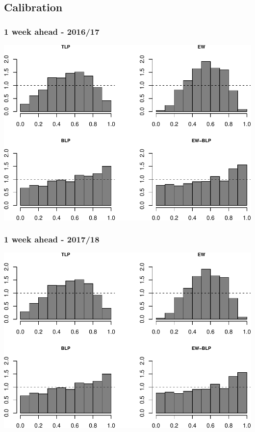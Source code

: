 \documentclass[]{article}
\begin{document}
\hypertarget{calibration}{%
\subsection{Calibration}\label{calibration}}

\hypertarget{week-ahead---201617}{%
\subsubsection{1 week ahead - 2016/17}\label{week-ahead---201617}}

\includegraphics{BLPcalibration_app_files/figure-latex/unnamed-chunk-6-1.pdf}

\hypertarget{week-ahead---201718}{%
\subsubsection{1 week ahead - 2017/18}\label{week-ahead---201718}}

\includegraphics{BLPcalibration_app_files/figure-latex/unnamed-chunk-7-1.pdf}
\end{document}
